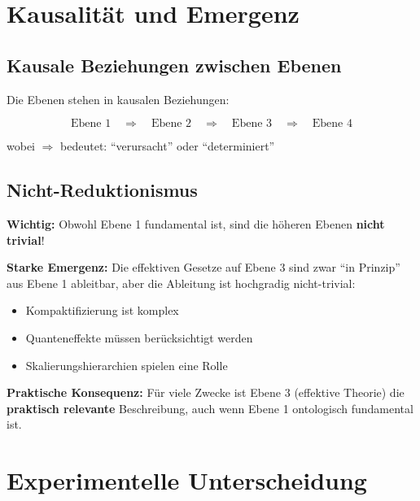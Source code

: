 	\section{Kausalität und Emergenz}
	
	\subsection{Kausale Beziehungen zwischen Ebenen}
	
	Die Ebenen stehen in kausalen Beziehungen:
	
	\begin{equation}
		\text{Ebene 1} \quad \Rightarrow \quad \text{Ebene 2} \quad \Rightarrow \quad \text{Ebene 3} \quad \Rightarrow \quad \text{Ebene 4}
	\end{equation}
	
	wobei $\Rightarrow$ bedeutet: \enquote{verursacht} oder \enquote{determiniert}
	
	\subsection{Nicht-Reduktionismus}
	
	\begin{philosophical}
		\textbf{Wichtig:} Obwohl Ebene 1 fundamental ist, sind die höheren Ebenen \textbf{nicht trivial}!
		
		\vspace{0.3cm}
		
		\textbf{Starke Emergenz:}
		Die effektiven Gesetze auf Ebene 3 sind zwar \enquote{in Prinzip} aus Ebene 1 ableitbar, aber die Ableitung ist hochgradig nicht-trivial:
		\begin{itemize}
			\item Kompaktifizierung ist komplex
			\item Quanteneffekte müssen berücksichtigt werden
			\item Skalierungshierarchien spielen eine Rolle
		\end{itemize}
		
		\vspace{0.3cm}
		
		\textbf{Praktische Konsequenz:}
		Für viele Zwecke ist Ebene 3 (effektive Theorie) die \textbf{praktisch relevante} Beschreibung, auch wenn Ebene 1 ontologisch fundamental ist.
	\end{philosophical}
	
	\section{Experimentelle Unterscheidung}
	
